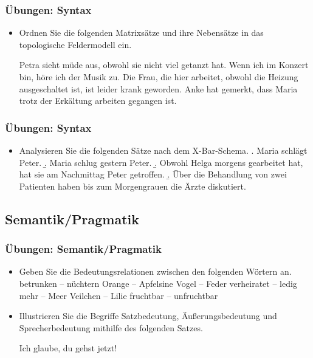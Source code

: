 \begin{frame}
\frametitle{Übungen: Syntax}

\begin{itemize}
	\item Ordnen Sie die folgenden Matrixsätze und ihre Nebensätze in das topologische Feldermodell ein.
	
	\eal
	\ex Petra sieht müde aus, obwohl sie nicht viel getanzt hat.
	\ex Wenn ich im Konzert bin, höre ich der Musik zu.
	\ex Die Frau, die hier arbeitet, obwohl die Heizung ausgeschaltet ist, ist leider krank geworden.
	\ex Anke hat gemerkt, dass Maria trotz der Erkältung arbeiten gegangen ist.
	\zl
	
\end{itemize}

\end{frame}


\begin{frame}
\frametitle{Übungen: Syntax}

\begin{itemize}
	\item Analysieren Sie die folgenden Sätze nach dem X-Bar-Schema.
	\a. Maria schlägt Peter.
	\b. Maria schlug gestern Peter.
	\b. Obwohl Helga morgens gearbeitet hat, hat sie am Nachmittag Peter getroffen.
	\b. Über die Behandlung von zwei Patienten haben bis zum Morgengrauen die Ärzte diskutiert.
	
\end{itemize}

\end{frame}


\subsection{Semantik/Pragmatik}

\begin{frame}
\frametitle{Übungen: Semantik/Pragmatik}

\begin{itemize}
	\item Geben Sie die Bedeutungsrelationen zwischen den folgenden Wörtern an.
	\eal
	\ex betrunken -- nüchtern
	\ex Orange -- Apfelsine
	\ex Vogel -- Feder
	\ex verheiratet -- ledig
	\ex mehr -- Meer
	\ex Veilchen -- Lilie
	\ex fruchtbar -- unfruchtbar
	\zl
	
	\item Illustrieren Sie die Begriffe Satzbedeutung, Äußerungsbedeutung und Sprecherbedeutung mithilfe des folgenden Satzes.
	
	\ea Ich glaube, du gehst jetzt!
	\z
	
\end{itemize}

\end{frame}


